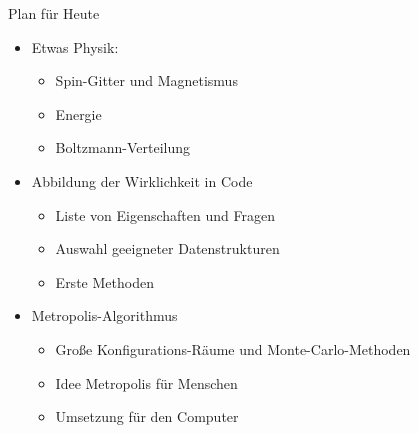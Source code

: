 
\begin{frame}[fragile]{Plan für Heute}
%
\begin{itemize}
\item Etwas Physik: 
	\begin{itemize}
	\item Spin-Gitter und Magnetismus
	\item Energie
	\item Boltzmann-Verteilung
	\end{itemize}
\item Abbildung der Wirklichkeit in Code
	\begin{itemize}
	\item Liste von Eigenschaften und Fragen
	\item Auswahl geeigneter Datenstrukturen
	\item Erste Methoden
	\end{itemize}
\item Metropolis-Algorithmus
	\begin{itemize}
	\item Große Konfigurations-Räume und Monte-Carlo-Methoden
	\item Idee Metropolis für Menschen
	\item Umsetzung für den Computer
	\end{itemize}
\end{itemize}
%
\end{frame}


